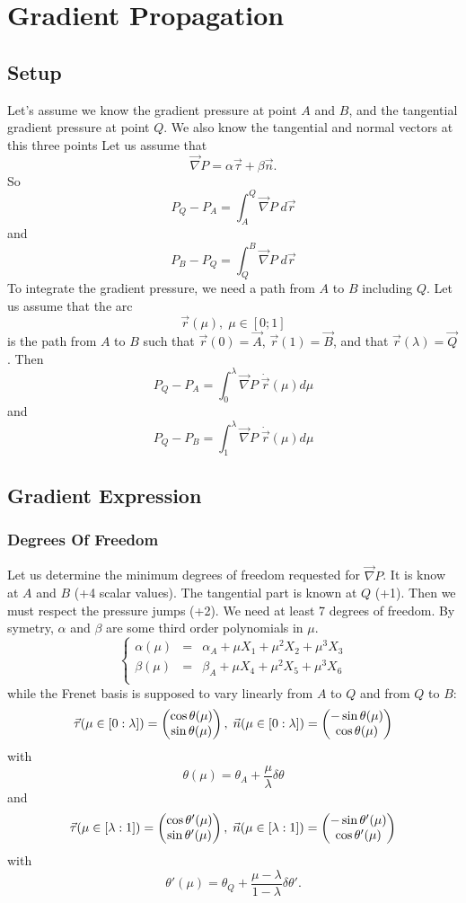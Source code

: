 \documentclass[11pt]{amsart}
\newcommand{\mygrad}{\vec{\nabla}}
\begin{document}
\section{Gradient Propagation}
\subsection{Setup}
Let's assume we know the gradient pressure at point $A$ and $B$, and
the tangential gradient pressure at point $Q$.
We also know the tangential and normal vectors at this three points
Let us assume that
\[
	\mygrad P = \alpha \vec{\tau} + \beta \vec{n}.
\]
So
\[
	P_Q - P_A = \int_A^Q \mygrad P \; d\vec{r}
\]
and
\[
	P_B - P_Q = \int_Q^B  \mygrad P \; d\vec{r}
\]
To integrate the gradient pressure, we need a path from $A$ to $B$ including $Q$.
Let us assume that the arc
\[
		\vec{r}(\mu), \;\mu\in[0;1]
\]
is the path from $A$ to $B$ such that $\vec{r}(0)=\vec{A}$, $\vec{r}(1)=\vec{B}$, and that $\vec{r}(\lambda)=\vec{Q}$.
Then
\[
	P_Q - P_A = \int_0^\lambda \mygrad P \; \dot{\vec{r}}(\mu) d\mu
\]
and
\[
	P_Q - P_B = \int_1^\lambda \mygrad P \; \dot{\vec{r}}(\mu) d\mu
\]
\subsection{Gradient Expression}
\subsubsection{Degrees Of Freedom}
Let us determine the minimum degrees of freedom requested for $\mygrad P$.
It is know at $A$ and $B$ (+4 scalar values).
The tangential part is known at $Q$ (+1).
Then we must respect the pressure jumps (+2).
We need at least 7 degrees of freedom.
By symetry, $\alpha$ and $\beta$ are some third order polynomials in $\mu$.
\[
	\left\lbrace
	\begin{array}{rcl}
		\alpha(\mu) & = & \alpha_A + \mu X_1 + \mu^2 X_2 + \mu^3 X_3\\
		\beta(\mu)  & = & \beta_A  + \mu X_4 + \mu^2 X_5 + \mu^3 X_6\\
	\end{array}
	\right.
\]
while the Frenet basis is supposed to vary linearly from $A$ to $Q$ and from $Q$ to $B$:
\[
	\vec{\tau}(\mu\in[0:\lambda]) =
	\begin{pmatrix}
	 \cos \theta(\mu)\cr
	 \sin \theta(\mu)
	 \end{pmatrix},\;
	 \vec{n}(\mu\in[0:\lambda]) =
	\begin{pmatrix}
	 -\sin \theta(\mu)\cr
	 \cos \theta(\mu)
	 \end{pmatrix}
\]
with 
\[
	\theta(\mu) = \theta_A + \frac{\mu}{\lambda} \delta\theta
\]
and
\[
	\vec{\tau}(\mu\in[\lambda:1]) =
	\begin{pmatrix}
	 \cos \theta'(\mu)\cr
	 \sin \theta'(\mu)
	 \end{pmatrix},\;
	 \vec{n}(\mu\in[\lambda:1]) =
	\begin{pmatrix}
	 -\sin \theta'(\mu)\cr
	 \cos \theta'(\mu)
	 \end{pmatrix}
\]
with 
\[
	\theta'(\mu) = \theta_Q + \dfrac{\mu-\lambda}{1-\lambda} \delta\theta'.
\]
\end{document}

